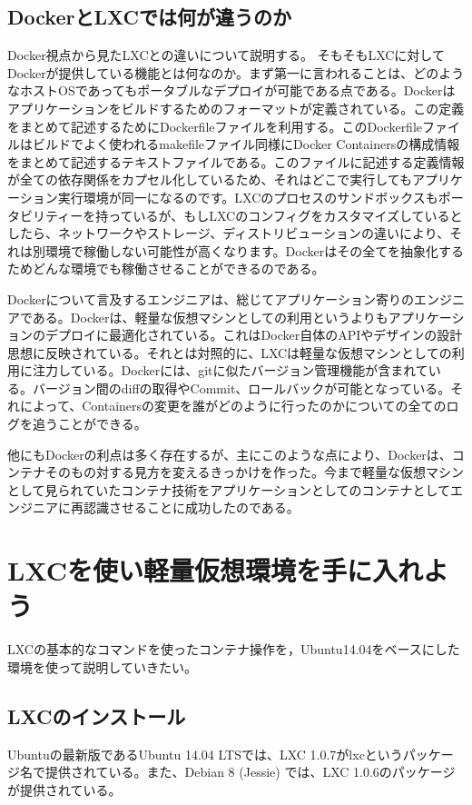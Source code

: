 \documentclass[9pt,b5paper,tombo]{jsbook}
\begin{document}
\subsection{DockerとLXCでは何が違うのか}
Docker視点から見たLXCとの違いについて説明する。
そもそもLXCに対してDockerが提供している機能とは何なのか。まず第一に言われることは、どのようなホストOSであってもポータブルなデプロイが可能である点である。Dockerはアプリケーションをビルドするためのフォーマットが定義されている。この定義をまとめて記述するためにDockerfileファイルを利用する。このDockerfileファイルはビルドでよく使われるmakefileファイル同様にDocker Containersの構成情報をまとめて記述するテキストファイルである。このファイルに記述する定義情報が全ての依存関係をカプセル化しているため、それはどこで実行してもアプリケーション実行環境が同一になるのです。LXCのプロセスのサンドボックスもポータビリティーを持っているが、もしLXCのコンフィグをカスタマイズしているとしたら、ネットワークやストレージ、ディストリビューションの違いにより、それは別環境で稼働しない可能性が高くなります。Dockerはその全てを抽象化するためどんな環境でも稼働させることができるのである。

Dockerについて言及するエンジニアは、総じてアプリケーション寄りのエンジニアである。Dockerは、軽量な仮想マシンとしての利用というよりもアプリケーションのデプロイに最適化されている。これはDocker自体のAPIやデザインの設計思想に反映されている。それとは対照的に、LXCは軽量な仮想マシンとしての利用に注力している。Dockerには、gitに似たバージョン管理機能が含まれている。バージョン間のdiffの取得やCommit、ロールバックが可能となっている。それによって、Containersの変更を誰がどのように行ったのかについての全てのログを追うことができる。

他にもDockerの利点は多く存在するが、主にこのような点により、Dockerは、コンテナそのもの対する見方を変えるきっかけを作った。今まで軽量な仮想マシンとして見られていたコンテナ技術をアプリケーションとしてのコンテナとしてエンジニアに再認識させることに成功したのである。

\section{LXCを使い軽量仮想環境を手に入れよう}
LXCの基本的なコマンドを使ったコンテナ操作を，Ubuntu14.04をベースにした環境を使って説明していきたい。

\subsection{LXCのインストール}
Ubuntuの最新版であるUbuntu 14.04 LTSでは、LXC 1.0.7がlxcというパッケージ名で提供されている。また、Debian 8 (Jessie) では、LXC 1.0.6のパッケージが提供されている。
\end{document}
